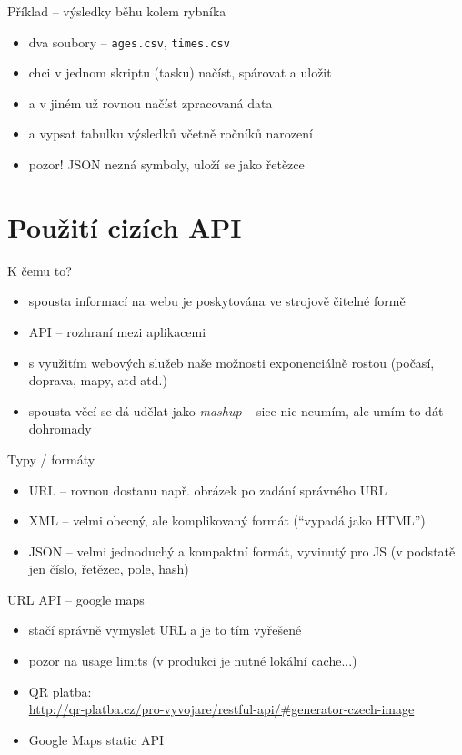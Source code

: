 \documentclass{beamer}
\begin{document}
\begin{frame}{Příklad -- výsledky běhu kolem rybníka}
  \begin{itemize}
    \item dva soubory -- \texttt{ages.csv}, \texttt{times.csv}
    \item chci v jednom skriptu (tasku) načíst, spárovat a uložit
    \item a v jiném už rovnou načíst zpracovaná data
    \item a vypsat tabulku výsledků včetně ročníků narození
    \item pozor! JSON nezná symboly, uloží se jako řetězce
  \end{itemize}
\end{frame}

\section{Použití cizích API}

\begin{frame}{K čemu to?}
  \begin{itemize}
    \item spousta informací na webu je poskytována ve strojově čitelné formě
    \item API -- rozhraní mezi aplikacemi
    \item s využitím webových služeb naše možnosti exponenciálně rostou (počasí, doprava, mapy, atd atd.)
    \item spousta věcí se dá udělat jako \emph{mashup} -- sice nic neumím, ale umím to dát dohromady
  \end{itemize}
\end{frame}


\begin{frame}{Typy / formáty}
  \begin{itemize}
    \item URL -- rovnou dostanu např. obrázek po zadání správného URL
    \item XML -- velmi obecný, ale komplikovaný formát (``vypadá jako HTML'')
    \item JSON -- velmi jednoduchý a kompaktní formát, vyvinutý pro JS (v podstatě jen číslo, řetězec, pole, hash)
  \end{itemize}
\end{frame}


\begin{frame}{URL API -- google maps}
  \begin{itemize}
    \item stačí správně vymyslet URL a je to tím vyřešené
    \item pozor na usage limits (v produkci je nutné lokální cache...)
    \item QR platba: \\
    {\tiny \url{http://qr-platba.cz/pro-vyvojare/restful-api/\#generator-czech-image}}
    \item Google Maps static API
  \end{itemize}
\end{frame}
\end{document}
